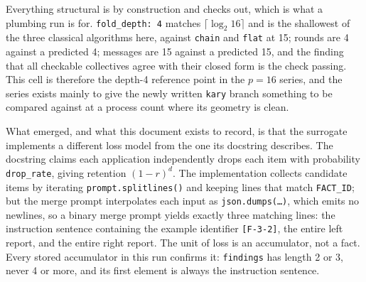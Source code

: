 \documentclass[11pt]{article}
\begin{document}
Everything structural is by construction and checks out, which is what a plumbing run is
for. \texttt{fold\_depth: 4} matches $\lceil\log_2 16\rceil$ and is the shallowest of the
three classical algorithms here, against \texttt{chain} and \texttt{flat} at 15; rounds are
4 against a predicted 4; messages are 15 against a predicted 15, and the finding that all
checkable collectives agree with their closed form is the check passing. This cell is
therefore the depth-4 reference point in the $p=16$ series, and the series exists mainly to
give the newly written \texttt{kary} branch something to be compared against at a process
count where its geometry is clean.

What emerged, and what this document exists to record, is that the surrogate implements a
different loss model from the one its docstring describes. The docstring claims each
application independently drops each item with probability \texttt{drop\_rate}, giving
retention $(1-r)^d$. The implementation collects candidate items by iterating
\texttt{prompt.splitlines()} and keeping lines that match \texttt{FACT\_ID}; but the merge
prompt interpolates each input as \texttt{json.dumps(\dots)}, which emits no newlines, so a
binary merge prompt yields exactly three matching lines: the instruction sentence
containing the example identifier \texttt{[F-3-2]}, the entire left report, and the entire
right report. The unit of loss is an accumulator, not a fact. Every stored accumulator in
this run confirms it: \texttt{findings} has length 2 or 3, never 4 or more, and its first
element is always the instruction sentence.
\end{document}
